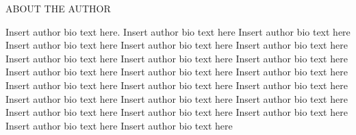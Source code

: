 ABOUT THE AUTHOR

Insert author bio text here. Insert author bio text here Insert author bio text here Insert author bio text here Insert author bio text here Insert author bio text here Insert author bio text here Insert author bio text here Insert author bio text here Insert author bio text here Insert author bio text here Insert author bio text here Insert author bio text here Insert author bio text here Insert author bio text here Insert author bio text here Insert author bio text here Insert author bio text here Insert author bio text here Insert author bio text here Insert author bio text here Insert author bio text here Insert author bio text here

 